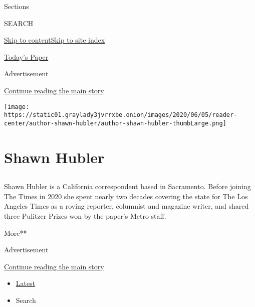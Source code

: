 Sections

SEARCH

\protect\hyperlink{site-content}{Skip to
content}\protect\hyperlink{site-index}{Skip to site index}

\href{https://myaccount.nytimes3xbfgragh.onion/auth/login?response_type=cookie\&client_id=vi}{}

\href{https://www.nytimes3xbfgragh.onion/section/todayspaper}{Today's
Paper}

Advertisement

\protect\hyperlink{after-top}{Continue reading the main story}

\texttt{[image: https://static01.graylady3jvrrxbe.onion/images/2020/06/05/reader-center/author-shawn-hubler/author-shawn-hubler-thumbLarge.png]}

\hypertarget{shawn-hubler}{%
\section{Shawn Hubler}\label{shawn-hubler}}

\subsection{}

Shawn Hubler is a California correspondent based in Sacramento. Before
joining The Times in 2020 she spent nearly two decades covering the
state for The Los Angeles Times as a roving reporter, columnist and
magazine writer, and shared three Pulitzer Prizes won by the paper's
Metro staff.

More**

Advertisement

\protect\hyperlink{after-mid1}{Continue reading the main story}

\begin{itemize}
\tightlist
\item
  \protect\hyperlink{stream-panel}{Latest}
\item
  Search
\end{itemize}

